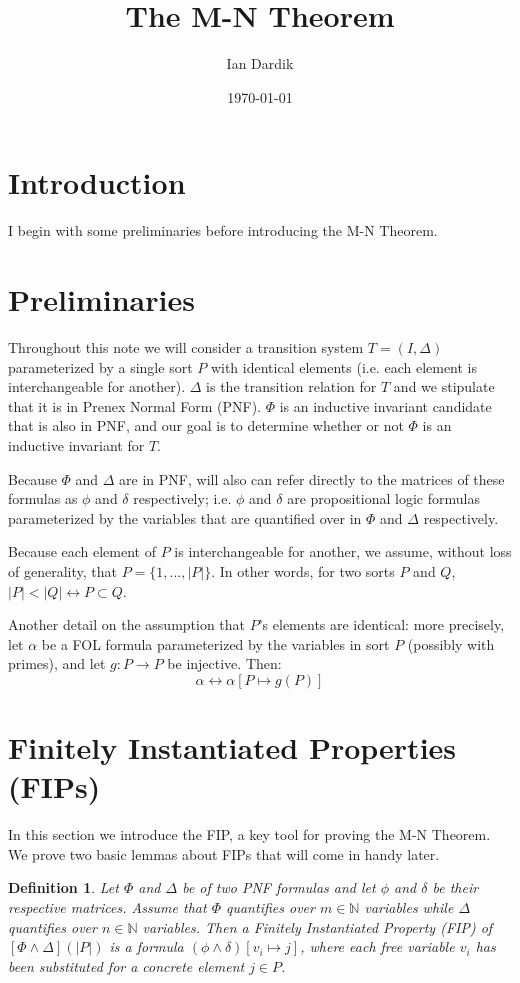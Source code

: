 \documentclass[12pt]{article}
\title{The M-N Theorem}
\author{Ian Dardik}
\date{\today}
\newtheorem{definition}{Definition}
\begin{document}
\maketitle

\section{Introduction}
I begin with some preliminaries before introducing the M-N Theorem.


\section{Preliminaries}
Throughout this note we will consider a transition system $T=(I,\Delta)$ parameterized by a single sort $P$ with identical elements (i.e. each element is interchangeable for another).  $\Delta$ is the transition relation for $T$ and we stipulate that it is in Prenex Normal Form (PNF).  $\Phi$ is an inductive invariant candidate that is also in PNF, and our goal is to determine whether or not $\Phi$ is an inductive invariant for $T$.

Because $\Phi$ and $\Delta$ are in PNF, will also can refer directly to the matrices of these formulas as $\phi$ and $\delta$ respectively; i.e. $\phi$ and $\delta$ are propositional logic formulas parameterized by the variables that are quantified over in $\Phi$ and $\Delta$ respectively.

Because each element of $P$ is interchangeable for another, we assume, without loss of generality, that $P = \{1,...,|P|\}$.  In other words, for two sorts $P$ and $Q$, $|P| < |Q| \leftrightarrow P \subset Q$.

Another detail on the assumption that $P$'s elements are identical: more precisely, let $\alpha$ be a FOL formula parameterized by the variables in sort $P$ (possibly with primes), and let $g : P \to P$ be injective.  Then:
$$\alpha \leftrightarrow \alpha[P \mapsto g(P)]$$


\section{Finitely Instantiated Properties (FIPs)}
In this section we introduce the FIP, a key tool for proving the M-N Theorem.  We prove two basic lemmas about FIPs that will come in handy later.

\begin{definition}
  Let $\Phi$ and $\Delta$ be of two PNF formulas and let $\phi$ and $\delta$ be their respective matrices.  Assume that $\Phi$ quantifies over $m \in \mathbb{N}$ variables while $\Delta$ quantifies over $n \in \mathbb{N}$ variables.  Then a Finitely Instantiated Property (FIP) of $[\Phi\land\Delta](|P|)$ is a formula $(\phi \land \delta) [v_i \mapsto j]$, where each free variable $v_i$ has been substituted for a concrete element $j \in P$.  
\end{definition}
\end{document}

